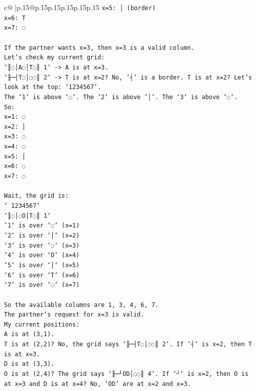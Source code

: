 \documentclass{article}
\begin{document}
{\begin{supertabular}{c@{$\;$}|p{.15\linewidth}@{}p{.15\linewidth}p{.15\linewidth}p{.15\linewidth}p{.15\linewidth}p{.15\linewidth}}
{{{\texttt{x=5: │ (border)} \\
\texttt{x=6: T} \\
\texttt{x=7: ◌} \\
\\ 
\texttt{If the partner wants x=3, then x=3 is a valid column.} \\
\texttt{Let's check my current grid:} \\
\texttt{`║◌│A◌│T◌║ 1` {-}> A is at x=3.} \\
\texttt{`╟─┤T◌│◌◌║ 2` {-}> T is at x=2? No, `┤` is a border. T is at x=2? Let's look at the top: `1234567`.} \\
\texttt{The `1` is above `◌`. The `2` is above `│`. The `3` is above `◌`.} \\
\texttt{So:} \\
\texttt{x=1: ◌} \\
\texttt{x=2: │} \\
\texttt{x=3: ◌} \\
\texttt{x=4: ◌} \\
\texttt{x=5: │} \\
\texttt{x=6: ◌} \\
\texttt{x=7: ◌} \\
\\ 
\texttt{Wait, the grid is:} \\
\texttt{` 1234567`} \\
\texttt{`║◌│◌O│T◌║ 1`} \\
\texttt{`1` is over `◌` (x=1)} \\
\texttt{`2` is over `│` (x=2)} \\
\texttt{`3` is over `◌` (x=3)} \\
\texttt{`4` is over `O` (x=4)} \\
\texttt{`5` is over `│` (x=5)} \\
\texttt{`6` is over `T` (x=6)} \\
\texttt{`7` is over `◌` (x=7)} \\
\\ 
\texttt{So the available columns are 1, 3, 4, 6, 7.} \\
\texttt{The partner's request for x=3 is valid.} \\
\texttt{My current positions:} \\
\texttt{A is at (3,1).} \\
\texttt{T is at (2,2)? No, the grid says `╟─┤T◌│◌◌║ 2`. If `┤` is x=2, then T is at x=3.} \\
\texttt{D is at (3,3).} \\
\texttt{O is at (2,4)? The grid says `╟─┘OD│◌◌║ 4`. If `┘` is x=2, then O is at x=3 and D is at x=4? No, `OD` are at x=2 and x=3.} \\
}}}
\end{supertabular}}
\end{document}
